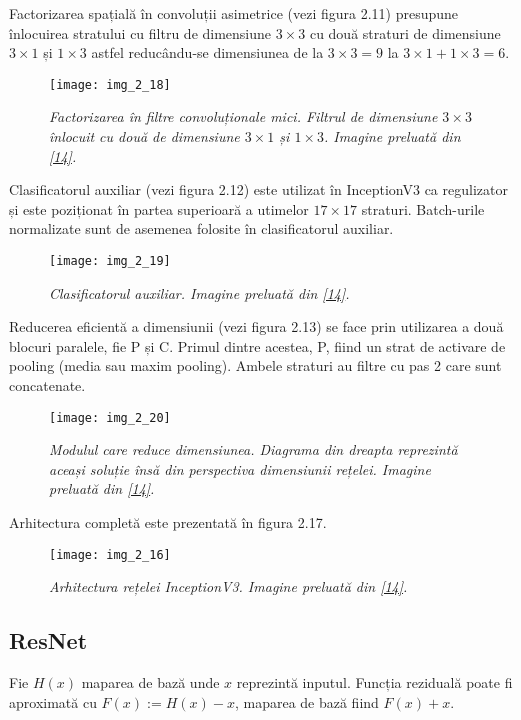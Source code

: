 Factorizarea spațială în convoluții asimetrice (vezi figura 2.11) presupune înlocuirea stratului cu filtru de dimensiune $3 \times 3$ cu două straturi de dimensiune $3 \times 1$ și $1 \times 3$ astfel reducându-se dimensiunea de la $3 \times 3 = 9$ la $3 \times 1 + 1 \times 3 = 6$. 
\begin{figure}[!h]
	\centering
	\texttt{[image: img\_2\_18]}
	\caption[Factorizarea spațială în convoluții asimetrice]{\textit{Factorizarea în filtre convoluționale mici. Filtrul de dimensiune $3 \times 3$ înlocuit cu două de dimensiune $3 \times 1$ și $1 \times 3$.  Imagine preluată din \hyperlink{guideinceptionv3}{[14]}.}}
\end{figure}

Clasificatorul auxiliar (vezi figura 2.12) este utilizat în InceptionV3 ca regulizator și este poziționat în partea superioară a utimelor $17 \times 17$ straturi. Batch-urile normalizate sunt de asemenea folosite în clasificatorul auxiliar.
\begin{figure}[!h]
	\centering
	\texttt{[image: img\_2\_19]}
	\caption[Clasificator auxiliar]{\textit{Clasificatorul auxiliar. Imagine preluată din \hyperlink{guideinceptionv3}{[14]}.}}
\end{figure}

Reducerea eficientă a dimensiunii (vezi figura 2.13) se face prin utilizarea a două blocuri paralele, fie P și C. Primul dintre acestea, P, fiind un strat de activare de pooling (media sau maxim pooling). Ambele straturi au filtre cu pas 2 care sunt concatenate.
\begin{figure}[!h]
	\centering
	\texttt{[image: img\_2\_20]}
	\caption[Reducerea eficientă a dimensiunii]{\textit{Modulul care reduce dimensiunea. Diagrama din dreapta reprezintă aceași soluție însă din perspectiva dimensiunii rețelei. Imagine preluată din \hyperlink{guideinceptionv3}{[14]}.}}
\end{figure}   

Arhitectura completă este prezentată în figura 2.17.
\begin{figure}[!h]
	\centering
	\texttt{[image: img\_2\_16]}
	\caption[Arhitectura InceptionV3]{\textit{Arhitectura rețelei InceptionV3. Imagine preluată din \hyperlink{guideinceptionv3}{[14]}.}}
\end{figure}   


\subsection{ResNet}
Fie $H(x)$ maparea de bază unde $x$ reprezintă inputul. Funcția reziduală poate fi aproximată cu $F(x) := H(x) - x$, maparea de bază fiind $F(x) + x$.


